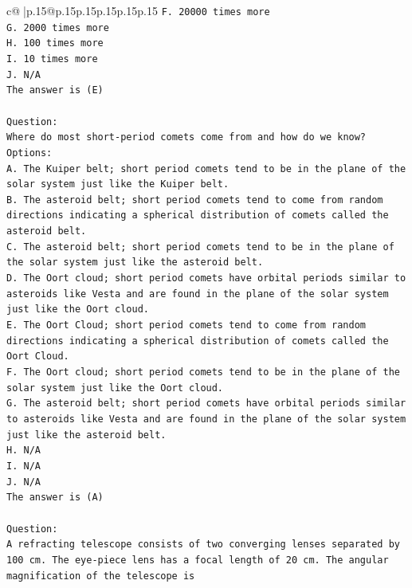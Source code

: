 \documentclass{article}
\begin{document}
{\begin{supertabular}{c@{$\;$}|p{.15\linewidth}@{}p{.15\linewidth}p{.15\linewidth}p{.15\linewidth}p{.15\linewidth}p{.15\linewidth}}
{{{\texttt{F. 20000 times more} \\
\texttt{G. 2000 times more} \\
\texttt{H. 100 times more} \\
\texttt{I. 10 times more} \\
\texttt{J. N/A} \\
\texttt{The answer is (E)} \\
\\ 
\texttt{Question:} \\
\texttt{Where do most short{-}period comets come from and how do we know?} \\
\texttt{Options:} \\
\texttt{A. The Kuiper belt; short period comets tend to be in the plane of the solar system just like the Kuiper belt.} \\
\texttt{B. The asteroid belt; short period comets tend to come from random directions indicating a spherical distribution of comets called the asteroid belt.} \\
\texttt{C. The asteroid belt; short period comets tend to be in the plane of the solar system just like the asteroid belt.} \\
\texttt{D. The Oort cloud; short period comets have orbital periods similar to asteroids like Vesta and are found in the plane of the solar system just like the Oort cloud.} \\
\texttt{E. The Oort Cloud; short period comets tend to come from random directions indicating a spherical distribution of comets called the Oort Cloud.} \\
\texttt{F. The Oort cloud; short period comets tend to be in the plane of the solar system just like the Oort cloud.} \\
\texttt{G. The asteroid belt; short period comets have orbital periods similar to asteroids like Vesta and are found in the plane of the solar system just like the asteroid belt.} \\
\texttt{H. N/A} \\
\texttt{I. N/A} \\
\texttt{J. N/A} \\
\texttt{The answer is (A)} \\
\\ 
\texttt{Question:} \\
\texttt{A refracting telescope consists of two converging lenses separated by 100 cm. The eye{-}piece lens has a focal length of 20 cm. The angular magnification of the telescope is} \\
}}}
\end{supertabular}}
\end{document}
